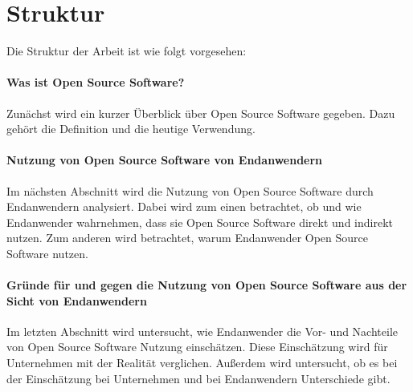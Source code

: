 \documentclass[a4paper]{article}
\begin{document}
	   
	\section{Struktur}
    		Die Struktur der Arbeit ist wie folgt vorgesehen:
    
    		\paragraph{Was ist Open Source Software?}
    		Zunächst wird ein kurzer Überblick über Open Source Software gegeben. Dazu gehört die Definition und die heutige Verwendung.
		
		\paragraph{Nutzung von Open Source Software von Endanwendern}
		Im nächsten Abschnitt wird die Nutzung von Open Source Software durch Endanwendern analysiert. Dabei wird zum einen betrachtet, ob und wie Endanwender wahrnehmen, dass sie Open Source Software direkt und indirekt nutzen.
		Zum anderen wird betrachtet, warum Endanwender Open Source Software nutzen.
		
		\paragraph{Gründe für und gegen die Nutzung von Open Source Software aus der Sicht von Endanwendern}
		Im letzten Abschnitt wird untersucht, wie Endanwender die Vor- und Nachteile von Open Source Software Nutzung einschätzen.
		Diese Einschätzung wird für Unternehmen mit der Realität verglichen.
		Außerdem wird untersucht, ob es bei der Einschätzung bei Unternehmen und bei Endanwendern Unterschiede gibt.
	
    \clearpage
    \nocite{*}
    \printbibliography
\end{document}
